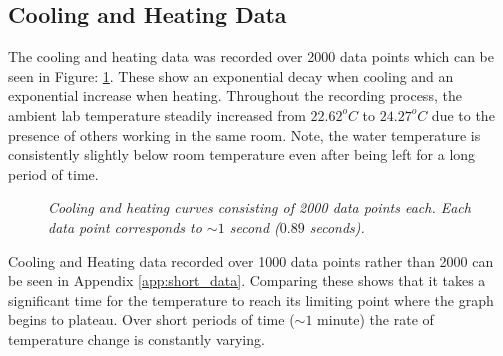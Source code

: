 \documentclass[10pt]{article}
\begin{document}
\subsection*{Cooling and Heating Data}
The cooling and heating data was recorded over 2000 data points which can be seen in Figure: \ref{fig:heat_and_cool_curve}. These show an exponential decay when cooling and an exponential increase when heating. Throughout the recording process, the ambient lab temperature steadily increased from $22.62^oC$ to $24.27^oC$ due to the presence of others working in the same room. Note, the water temperature is consistently slightly below room temperature even after being left for a long period of time.\\

\begin{figure}[h!]
    \centering
    \qquad
    \caption{\it{Cooling and heating curves consisting of 2000 data points each. Each data point corresponds to $\sim 1$ second ($0.89$ seconds). }}%
    \label{fig:heat_and_cool_curve}%
\end{figure}

Cooling and Heating data recorded over 1000 data points rather than 2000 can be seen in Appendix \ref{app:short_data}. Comparing these shows that it takes a significant time for the temperature to reach its limiting point where the graph begins to plateau. Over short periods of time ($\sim 1$ minute) the rate of temperature change is constantly varying.\\
\end{document}
